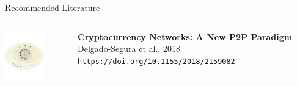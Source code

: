 \documentclass[handout]{beamer}
\begin{document}
\begin{frame}{Recommended Literature}
	\begin{columns}[T]
		\begin{column}{0.1\textwidth}
			\includegraphics[width = 1.7cm, frame]{../assets/images/p2p_paper}
		\end{column} %
		\begin{column}{0.8\textwidth}
			\textbf{Cryptocurrency Networks: A New P2P Paradigm} \\ 
			Delgado-Segura et al., 2018 \\
			\link \texttt{\url{https://doi.org/10.1155/2018/2159082}}
		\end{column}
	\end{columns}
\end{frame}
\end{document}
